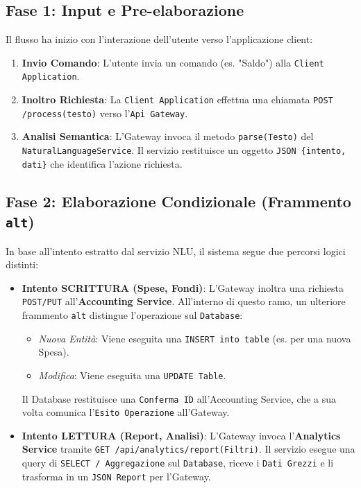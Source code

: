 \subsection{Fase 1: Input e Pre-elaborazione}
Il flusso ha inizio con l'interazione dell'utente verso l'applicazione client:
\begin{enumerate}
    \item \textbf{Invio Comando}: L'utente invia un comando (es. "Saldo") alla \texttt{Client Application}.
    \item \textbf{Inoltro Richiesta}: La \texttt{Client Application} effettua una chiamata \texttt{POST /process(testo)} verso l'\texttt{Api Gateway}.
    \item \textbf{Analisi Semantica}: L'Gateway invoca il metodo \texttt{parse(Testo)} del \\ \texttt{NaturalLanguageService}. Il servizio restituisce un oggetto \texttt{JSON \{intento, dati\}} che identifica l'azione richiesta.
\end{enumerate}

\subsection{Fase 2: Elaborazione Condizionale (Frammento \texttt{alt})}
In base all'intento estratto dal servizio NLU, il sistema segue due percorsi logici distinti:

\begin{itemize}
    \item \textbf{Intento SCRITTURA (Spese, Fondi)}: 
          L'Gateway inoltra una richiesta \texttt{POST/PUT} all'\textbf{Accounting Service}. All'interno di questo ramo, un ulteriore frammento \texttt{alt} distingue l'operazione sul \texttt{Database}:
          \begin{itemize}
              \item \textit{Nuova Entità}: Viene eseguita una \texttt{INSERT into table} (es. per una nuova Spesa).
              \item \textit{Modifica}: Viene eseguita una \texttt{UPDATE Table}.
          \end{itemize}
          Il Database restituisce una \texttt{Conferma ID} all'Accounting Service, che a sua volta comunica l'\texttt{Esito Operazione} all'Gateway.

    \item \textbf{Intento LETTURA (Report, Analisi)}: 
          L'Gateway invoca l'\textbf{Analytics Service} tramite \texttt{GET /api/analytics/report(Filtri)}. Il servizio esegue una query di \texttt{SELECT / Aggregazione} sul \texttt{Database}, riceve i \texttt{Dati Grezzi} e li trasforma in un \texttt{JSON Report} per l'Gateway.
\end{itemize}

